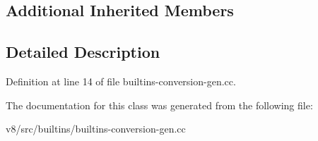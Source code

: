 \subsection*{Additional Inherited Members}


\subsection{Detailed Description}


Definition at line 14 of file builtins-\/conversion-\/gen.\+cc.



The documentation for this class was generated from the following file\+:\begin{DoxyCompactItemize}
\item 
v8/src/builtins/builtins-\/conversion-\/gen.\+cc\end{DoxyCompactItemize}

